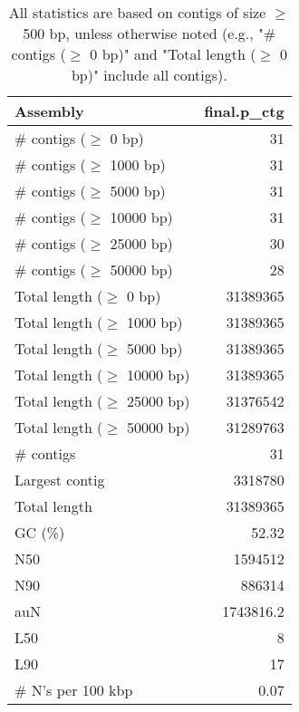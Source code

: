 \documentclass[12pt,a4paper]{article}
\begin{document}
\begin{table}[ht]
\begin{center}
\caption{All statistics are based on contigs of size $\geq$ 500 bp, unless otherwise noted (e.g., "\# contigs ($\geq$ 0 bp)" and "Total length ($\geq$ 0 bp)" include all contigs).}
\begin{tabular}{|l*{1}{|r}|}
\hline
Assembly & final.p\_ctg \\ \hline
\# contigs ($\geq$ 0 bp) & 31 \\ \hline
\# contigs ($\geq$ 1000 bp) & 31 \\ \hline
\# contigs ($\geq$ 5000 bp) & 31 \\ \hline
\# contigs ($\geq$ 10000 bp) & 31 \\ \hline
\# contigs ($\geq$ 25000 bp) & 30 \\ \hline
\# contigs ($\geq$ 50000 bp) & 28 \\ \hline
Total length ($\geq$ 0 bp) & 31389365 \\ \hline
Total length ($\geq$ 1000 bp) & 31389365 \\ \hline
Total length ($\geq$ 5000 bp) & 31389365 \\ \hline
Total length ($\geq$ 10000 bp) & 31389365 \\ \hline
Total length ($\geq$ 25000 bp) & 31376542 \\ \hline
Total length ($\geq$ 50000 bp) & 31289763 \\ \hline
\# contigs & 31 \\ \hline
Largest contig & 3318780 \\ \hline
Total length & 31389365 \\ \hline
GC (\%) & 52.32 \\ \hline
N50 & 1594512 \\ \hline
N90 & 886314 \\ \hline
auN & 1743816.2 \\ \hline
L50 & 8 \\ \hline
L90 & 17 \\ \hline
\# N's per 100 kbp & 0.07 \\ \hline
\end{tabular}
\end{center}
\end{table}
\end{document}
